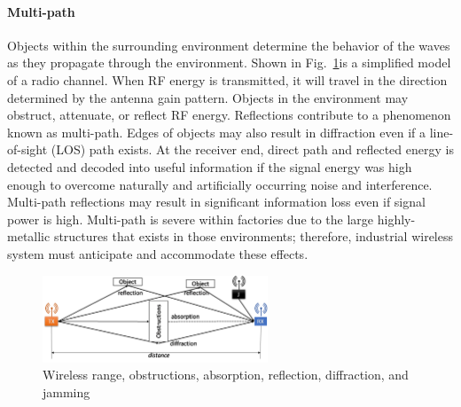 {\paragraph{Multi-path} Objects within the surrounding environment determine the behavior of the waves as they propagate through the environment.  Shown in Fig.~\ref{intro:fig:multipath}is a simplified model of a radio channel. When RF energy is transmitted, it will travel in the direction determined by the antenna gain pattern.  Objects in the environment may obstruct, attenuate, or reflect RF energy.  Reflections contribute to a phenomenon known as multi-path.   Edges of objects may also result in diffraction even if a line-of-sight (LOS) path exists.  At the receiver end, direct path and reflected energy is detected and decoded into useful information if the signal energy was high enough to overcome naturally and artificially occurring noise and interference.  Multi-path reflections may result in significant information loss even if signal power is high.  Multi-path is severe within factories due to the large highly-metallic structures that exists in those environments\cite{Candell2017.NIST1951,Rappaport1991,Remley2008}; therefore, industrial wireless system must anticipate and accommodate these effects.

\begin{figure}
	\centering
	\includegraphics[width=0.6\textwidth]{chapter-intro/images/multipath}
	\caption{Wireless range, obstructions, absorption, reflection, diffraction, and jamming}
	\label{intro:fig:multipath}
\end{figure}

}
